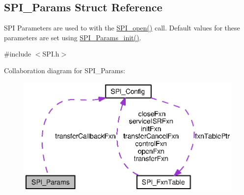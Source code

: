 \subsection{S\-P\-I\-\_\-\-Params Struct Reference}
\label{struct_s_p_i___params}


S\-P\-I Parameters are used to with the \hyperlink{_s_p_i_8h_a62cfe494cb1df47cd602e8747e894fd1}{S\-P\-I\-\_\-open()} call. Default values for these parameters are set using \hyperlink{_s_p_i_8h_a9c3dd1748332fd6e31c79a6538a71642}{S\-P\-I\-\_\-\-Params\-\_\-init()}.  




{\ttfamily \#include $<$S\-P\-I.\-h$>$}



Collaboration diagram for S\-P\-I\-\_\-\-Params\-:
\nopagebreak
\begin{figure}[H]
\begin{center}
\leavevmode
\includegraphics[width=344pt]{struct_s_p_i___params__coll__graph}
\end{center}
\end{figure}

